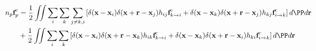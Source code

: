 \begin{align}
    n_p \textbf{f}^c_p 
    &= \frac{1}{2}\iint 
    \sum_i 
    \sum_k 
    \sum_{j\neq k,i}
    \left[
        \delta(\textbf{x} -\textbf{x}_i)
        \delta(\textbf{x} + \textbf{r} -\textbf{x}_j) h_{ij}
        \textbf{f}_{k \to i}^\text{c} 
        +
        \delta(\textbf{x} -\textbf{x}_k)
        \delta(\textbf{x} + \textbf{r} -\textbf{x}_j) h_{kj}
        \textbf{f}_{i \to k}^\text{c} 
    \right]
    d\PP d\textbf{r}\\
    &+ \frac{1}{2}\iint 
    \sum_i 
    \sum_k 
    \left[
        \delta(\textbf{x} -\textbf{x}_i)
        \delta(\textbf{x} + \textbf{r} -\textbf{x}_k) h_{ik}
        \textbf{f}_{k \to i}^\text{c} 
        +
        \delta(\textbf{x} -\textbf{x}_k)
        \delta(\textbf{x} + \textbf{r} -\textbf{x}_i) h_{ki}
        \textbf{f}_{i \to k}^\text{c} 
    \right]
    d\PP d\textbf{r}\\
\end{align}

